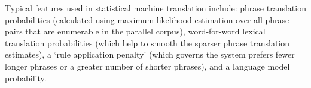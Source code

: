 \documentclass[11pt]{article}
\newcommand{\mnote}[1]{\marginpar{%
  \vskip-\baselineskip
  \raggedright\footnotesize
  \itshape\hrule\smallskip\footnotesize{#1}\par\smallskip\hrule}}
\begin{document}
Typical features used in statistical machine translation include:
phrase translation probabilities (calculated using maximum likelihood
estimation over all phrase pairs that are enumerable in the parallel
corpus), word-for-word lexical translation probabilities (which help
to smooth the sparser phrase translation estimates), a `rule application
penalty' (which governs the system prefers fewer longer phrases or a
greater number of shorter phrases), and a language model probability.

  

\end{document}
